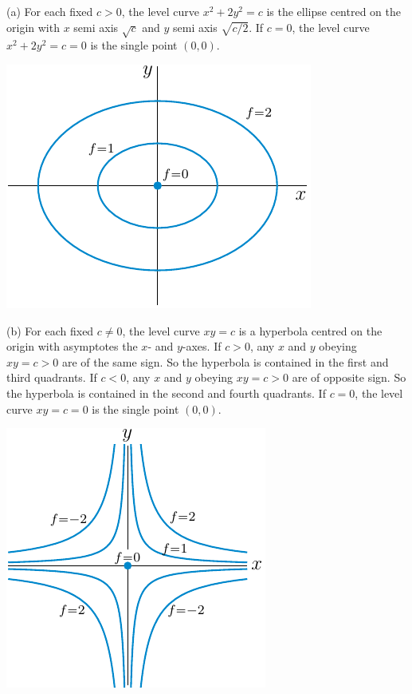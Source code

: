 \begin{solution} (a)
For each fixed $c>0$, the level curve $x^2+2y^2=c$ is the ellipse
centred on the origin with $x$ semi axis $\sqrt{c}$ and 
$y$ semi axis $\sqrt{c/2}$. If $c=0$,  the level curve $x^2+2y^2=c=0$
is the single point $(0,0)$.
\begin{center}
     \includegraphics{fig/levelEllipse.pdf}
\end{center}

(b)
For each fixed $c\ne 0$, the level curve $xy=c$ is a hyperbola
centred on the origin with asymptotes the $x$- and $y$-axes. 
If $c>0$, any $x$ and $y$ obeying $xy=c>0$ are of the same sign.
So the hyperbola is contained in the first and third quadrants.
If $c<0$, any $x$ and $y$ obeying $xy=c>0$ are of opposite sign.
So the hyperbola is contained in the second and fourth quadrants.
If $c=0$,  the level curve $xy=c=0$
is the single point $(0,0)$.
\begin{center}
     \includegraphics{fig/levelHyperbola.pdf}
\end{center}


\end{solution}
